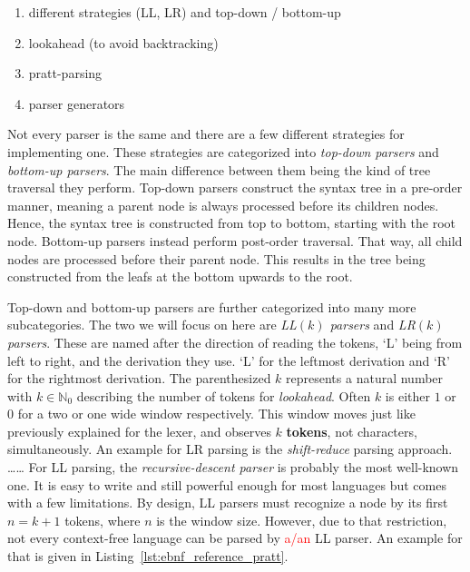 \begin{enumerate}
    \item different strategies (LL, LR) and top-down / bottom-up
    \item lookahead (to avoid backtracking)
    \item pratt-parsing
    \item parser generators
\end{enumerate}

Not every parser is the same and there are a few different strategies for implementing one.
These strategies are categorized into \emph{top-down parsers} and \emph{bottom-up parsers}.
The main difference between them being the kind of tree traversal they perform.
Top-down parsers construct the syntax tree in a pre-order manner, meaning a parent node is always processed before its children nodes.
Hence, the syntax tree is constructed from top to bottom, starting with the root node.
Bottom-up parsers instead perform post-order traversal.
That way, all child nodes are processed before their parent node.
This results in the tree being constructed from the leafs at the bottom upwards to the root.

Top-down and bottom-up parsers are further categorized into many more subcategories.
The two we will focus on here are \emph{LL$(k)$ parsers} and \emph{LR$(k)$ parsers}.
These are named after the direction of reading the tokens, `L' being from left to right, and the derivation they use.
`L' for the leftmost derivation and `R' for the rightmost derivation.
The parenthesized $k$ represents a natural number with $k\in\mathbb{N}_0$ describing the number of tokens for \emph{lookahead}.
Often $k$ is either $1$ or $0$ for a two or one wide window respectively.
This window moves just like previously explained for the lexer, and observes $k$ \textbf{tokens}, not characters, simultaneously.
An example for LR parsing is the \emph{shift-reduce} parsing approach.
\ldots{}\ldots
For LL parsing, the \emph{recursive-descent parser} is probably the most well-known one.
It is easy to write and still powerful enough for most languages but comes with a few limitations.
By design, LL parsers must recognize a node by its first $n=k+1$ tokens, where $n$ is the window size.
However, due to that restriction, not every context-free language can be parsed by \textcolor{red}{a/an} LL parser.
An example for that is given in Listing~\ref{lst:ebnf_reference_pratt}.

